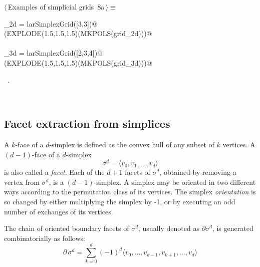 \documentclass[11pt,oneside]{article}	%
\begin{document}
\begin{flushleft} \small
\begin{minipage}{\linewidth} \label{scrap7}
\protect{}$\langle\,$Examples of simplicial grids\nobreak\ {\footnotesize 8a}$\,\rangle\equiv$
\vspace{-1ex}
\begin{list}{}{} \item
\mbox{}\verb@grid_2d = larSimplexGrid([3,3])@\\
\mbox{}\verb@VIEW(EXPLODE(1.5,1.5,1.5)(MKPOLS(grid_2d)))@\\
\mbox{}\verb@@\\
\mbox{}\verb@grid_3d = larSimplexGrid([2,3,4])@\\
\mbox{}\verb@VIEW(EXPLODE(1.5,1.5,1.5)(MKPOLS(grid_3d)))@\\
\mbox{}\verb@@{\NWsep}
\end{list}
\vspace{-1ex}
\footnotesize\addtolength{\baselineskip}{-1ex}
\begin{list}{}{\setlength{\itemsep}{-\parsep}\setlength{\itemindent}{-\leftmargin}}
\item \NWtxtMacroRefIn\ .
\end{list}
\end{minipage}\\[4ex]
\end{flushleft}


\subsection{Facet extraction from simplices}

A $k$-face of a $d$-simplex is defined as the convex hull of any subset of $k$ vertices.
A $(d-1)$-face of a $d$-simplex 
\[
\sigma^d = \langle v_0, v_1, \ldots, v_d \rangle
\]
 is also called a \emph{facet}. Each of the $d+1$ facets of $\sigma^d$, obtained by removing a vertex from $\sigma^d$, is a $(d-1)$-simplex. A simplex may be oriented in two different ways according to the permutation
class of its vertices. The simplex \emph{orientation} is so changed by either multiplying the simplex by -1, or by executing an odd number of exchanges of its vertices. 

The chain of oriented boundary facets of $\sigma^d$, usually denoted as $\partial \sigma^d$, is generated combinatorially as follows:
\[
\partial\, \sigma^d = \sum_{k=0}^d (-1)^d \langle v_0, \ldots, v_{k-1}, v_{k+1}, \ldots, v_d \rangle
\]
\end{document}

